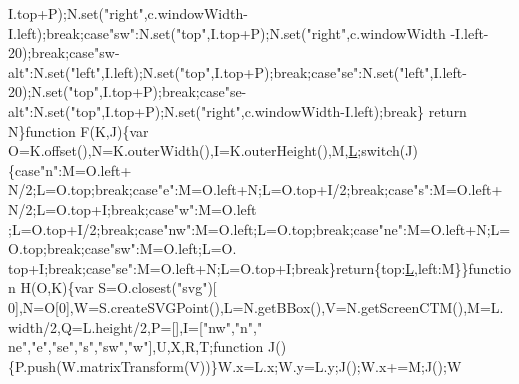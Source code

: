 \begin{DoxyCode}
      I.top+P);N.set(\textcolor{stringliteral}{"right"},c.windowWidth-I.left);\textcolor{keywordflow}{break};\textcolor{keywordflow}{case}\textcolor{stringliteral}{"sw"}:N.set(\textcolor{stringliteral}{"top"},I.top+P);N.set(\textcolor{stringliteral}{"right"},c.windowWidth
      -I.left-20);\textcolor{keywordflow}{break};\textcolor{keywordflow}{case}\textcolor{stringliteral}{"sw-alt"}:N.set(\textcolor{stringliteral}{"left"},I.left);N.set(\textcolor{stringliteral}{"top"},I.top+P);\textcolor{keywordflow}{break};\textcolor{keywordflow}{case}\textcolor{stringliteral}{"se"}:N.set(\textcolor{stringliteral}{"left"},I.left-
      20);N.set(\textcolor{stringliteral}{"top"},I.top+P);\textcolor{keywordflow}{break};\textcolor{keywordflow}{case}\textcolor{stringliteral}{"se-alt"}:N.set(\textcolor{stringliteral}{"top"},I.top+P);N.set(\textcolor{stringliteral}{"right"},c.windowWidth-I.left);\textcolor{keywordflow}{break}\}\textcolor{keywordflow}{
      return} N\}\textcolor{keyword}{function} F(K,J)\{var O=K.offset(),N=K.outerWidth(),I=K.outerHeight(),M,\hyperlink{jquery_8js_a38ee4c0b5f4fe2a18d0c783af540d253}{L};\textcolor{keywordflow}{switch}(J)\{\textcolor{keywordflow}{case}\textcolor{stringliteral}{"n"}:M=O.left+
      N/2;L=O.top;\textcolor{keywordflow}{break};\textcolor{keywordflow}{case}\textcolor{stringliteral}{"e"}:M=O.left+N;L=O.top+I/2;\textcolor{keywordflow}{break};\textcolor{keywordflow}{case}\textcolor{stringliteral}{"s"}:M=O.left+N/2;L=O.top+I;\textcolor{keywordflow}{break};\textcolor{keywordflow}{case}\textcolor{stringliteral}{"w"}:M=O.left
      ;L=O.top+I/2;\textcolor{keywordflow}{break};\textcolor{keywordflow}{case}\textcolor{stringliteral}{"nw"}:M=O.left;L=O.top;\textcolor{keywordflow}{break};\textcolor{keywordflow}{case}\textcolor{stringliteral}{"ne"}:M=O.left+N;L=O.top;\textcolor{keywordflow}{break};\textcolor{keywordflow}{case}\textcolor{stringliteral}{"sw"}:M=O.left;L=O.
      top+I;\textcolor{keywordflow}{break};\textcolor{keywordflow}{case}\textcolor{stringliteral}{"se"}:M=O.left+N;L=O.top+I;\textcolor{keywordflow}{break}\}\textcolor{keywordflow}{return}\{top:\hyperlink{jquery_8js_a38ee4c0b5f4fe2a18d0c783af540d253}{L},left:M\}\}\textcolor{keyword}{function} H(O,K)\{var S=O.closest(\textcolor{stringliteral}{"svg"})[
      0],N=O[0],W=S.createSVGPoint(),L=N.getBBox(),V=N.getScreenCTM(),M=L.width/2,Q=L.height/2,P=[],I=[\textcolor{stringliteral}{"nw"},\textcolor{stringliteral}{"n"},\textcolor{stringliteral}{"
      ne"},\textcolor{stringliteral}{"e"},\textcolor{stringliteral}{"se"},\textcolor{stringliteral}{"s"},\textcolor{stringliteral}{"sw"},\textcolor{stringliteral}{"w"}],U,X,R,T;\textcolor{keyword}{function} J()\{P.push(W.matrixTransform(V))\}W.x=L.x;W.y=L.y;J();W.x+=M;J();W

\end{DoxyCode}
